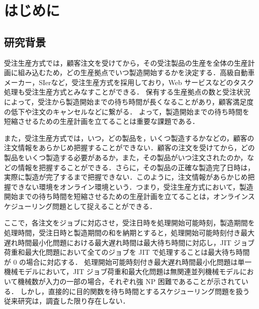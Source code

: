 \documentclass[12pt]{optlab-bachelor}
\begin{document}
\frontmatter

\chapter{はじめに}\label{c_1}
\section{研究背景}


受注生産方式では，顧客注文を受けてから，その受注製品の生産を全体の生産計画に組み込むため，どの生産拠点でいつ製造開始するかを決定する．高級自動車メーカー，SIerなど，受注生産方式を採用しており，Web サービスなどのタスク処理も受注生産方式とみなすことができる．
保有する生産拠点の数と受注状況によって，受注から製造開始までの待ち時間が長くなることがあり，顧客満足度の低下や注文のキャンセルなどに繋がる．
よって，製造開始までの待ち時間を短縮させるための生産計画を立てることは重要な課題である．

また，受注生産方式では，いつ，どの製品を，いくつ製造するかなどの，顧客の注文情報をあらかじめ把握することができない．顧客の注文を受けてから，どの製品をいくつ製造する必要があるか，また，その製品がいつ注文されたのか，などの情報を把握することができる．さらに，その製品の正確な製造完了日時は，実際に製造が完了するまで把握できない．このように，注文情報があらかじめ把握できない環境をオンライン環境という．つまり，受注生産方式において，製造開始までの待ち時間を短縮させるための生産計画を立てることは，オンラインスケジューリング問題として捉えることができる．

ここで，各注文をジョブに対応させ，受注日時を処理開始可能時刻，製造期間を処理時間，受注日時と製造期間の和を納期とすると，処理開始可能時刻付き最大遅れ時間最小化問題における最大遅れ時間は最大待ち時間に対応し，JIT ジョブ荷重和最大化問題において全てのジョブを JIT で処理することは最大待ち時間が 0 の場合に対応する． 処理開始可能時刻付き最大遅れ時間最小化問題は単一機械モデルにおいて，JIT ジョブ荷重和最大化問題は無関連並列機械モデルにおいて機械数が入力の一部の場合，それぞれ強 NP 困難であることが示されている．
しかし，直接的に目的関数を待ち時間とするスケジューリング問題を扱う従来研究は，調査した限り存在しない．

\end{document}
